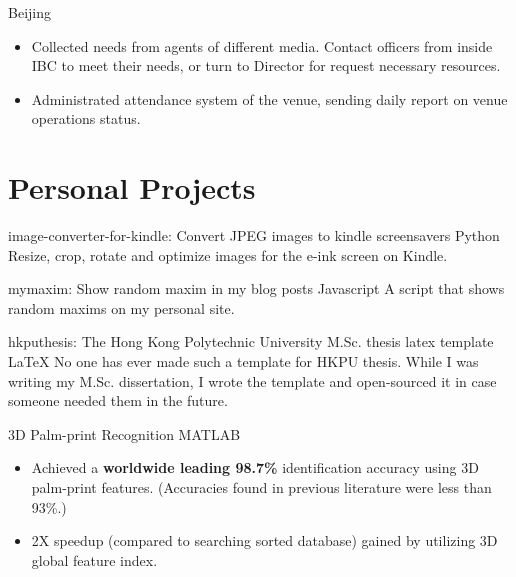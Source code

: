 \documentclass[10pt,a4paper]{moderncv/moderncv}
\begin{document}
{Beijing}{}
{
\begin{itemize}
	\item Collected needs from agents of different media. Contact officers from inside IBC to meet their needs, or turn to Director for request necessary resources.
	\item Administrated attendance system of the venue, sending daily report on venue operations status.
\end{itemize}
}


\section{Personal Projects}

{image-converter-for-kindle: Convert JPEG images to kindle screensavers}
{Python}
{}{}
{
Resize, crop, rotate and optimize images for the e-ink screen on Kindle.
}

{mymaxim: Show random maxim in my blog posts}
{Javascript}
{}{}
{
A script that shows random maxims on my personal site.
}

{hkputhesis: The Hong Kong Polytechnic University M.Sc. thesis latex template}
{\LaTeX}
{}{}
{
No one has ever made such a template for HKPU thesis. While I was writing my M.Sc. dissertation, I wrote the template and open-sourced it in case someone needed them in the future.
}

{3D Palm-print Recognition}
{MATLAB}
{}{}
{
\begin{itemize}
	\item Achieved a \textbf{worldwide leading 98.7\%} identification accuracy using 3D palm-print features. (Accuracies found in previous literature were less than 93\%.)
	\item 2X speedup (compared to searching sorted database) gained by utilizing 3D global feature index.
\end{itemize}
}
\end{document}
